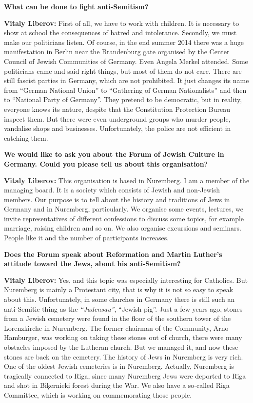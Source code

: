 \textbf{What can be done to fight anti-Semitism?} 

\textbf{Vitaly Liberov:} First of all, we have to work with children. It is necessary to show at school the consequences of hatred and intolerance. Secondly, we must make our politicians listen. Of course, in the end summer 2014 there was a huge manifestation in Berlin near the Brandenburg gate organised by the Center Council of Jewish Communities of Germany. Even Angela Merkel attended. Some politicians came and said right things, but most of them do not care. There are still fascist parties in Germany, which are not prohibited. It just changes its name from ``German National Union'' to ``Gathering of German Nationalists'' and then to ``National Party of Germany''. They pretend to be democratic, but in reality, everyone knows its nature, despite that the Constitution Protection Bureau inspect them. But there were even underground groups who murder people, vandalise shops and businesses. Unfortunately, the police are not efficient in catching them. 

\textbf{We would like to ask you about the Forum of Jewish Culture in Germany. Could you please tell us about this organisation?}  

\textbf{Vitaly Liberov:} This organisation is based in Nuremberg. I am a member of the managing board. It is a society which consists of Jewish and non-Jewish members. Our purpose is to tell about the history and traditions of Jews in Germany and in Nuremberg, particularly. We organise some events, lectures, we invite representatives of different confessions to discuss some topics, for example marriage, raising children and so on. We also organise excursions and seminars. People like it and the number of participants increases.  

\textbf{Does the Forum speak about Reformation and Martin Luther’s attitude toward the Jews, about his anti-Semitism?} 

\textbf{Vitaly Liberov:} Yes, and this topic was especially interesting for Catholics. But Nuremberg is mainly a Protestant city, that is why it is not so easy to speak about this. Unfortunately, in some churches in Germany there is still such an anti-Semitic thing as the \textit{``Judensau''}, ``Jewish pig''. Just a few years ago, stones from a Jewish cemetery were found in the floor of the southern tower of the Lorenzkirche in Nuremberg. The former chairman of the Community, Arno Hamburger, was working on taking these stones out of church, there were many obstacles imposed by the Lutheran church. But we managed it, and now these stones are back on the cemetery. The history of Jews in Nuremberg is very rich. One of the oldest Jewish cemeteries is in Nuremberg. Actually, Nuremberg is tragically connected to Riga, since many Nuremberg Jews were deported to Riga and shot in Biķernieki forest during the War. We also have a so-called Riga Committee, which is working on commemorating those people.